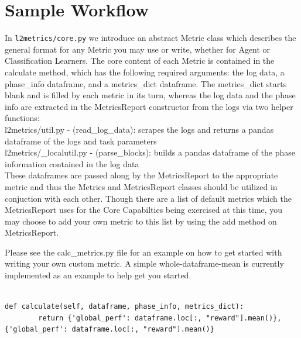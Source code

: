 \section{Sample Workflow}

In \verb|l2metrics/core.py| we introduce an abstract Metric class which describes the general format for any Metric you may use or write, whether for Agent or Classification Learners. The core content of each Metric is contained in the calculate method, which has the following required arguments: the log data, a phase\_info dataframe, and a metrics\_dict dataframe. The metrics\_dict starts blank and is filled by each metric in its turn, whereas the log data and the phase info are extracted in the MetricsReport constructor from the logs via two helper functions: \\[0.1in]

l2metrics/util.py - (read\_log\_data): scrapes the logs and returns a pandas dataframe of the logs and task parameters\\
l2metrics/\_localutil.py - (parse\_blocks): builds a pandas dataframe of the phase information contained in the log data\\[0.1in]

These dataframes are passed along by the MetricsReport to the appropriate metric and thus the Metrics and MetricsReport classes should be utilized in conjuction with each other. Though there are a list of default metrics which the MetricsReport uses for the Core Capabilties being exercised at this time, you may choose to add your own metric to this list by using the add method on MetricsReport. 

Please see the calc\_metrics.py file for an example on how to get started with writing your own custom metric. A simple whole-dataframe-mean is currently implemented as an example to help get you started.

\begin{verbatim}    

def calculate(self, dataframe, phase_info, metrics_dict):
        return {'global_perf': dataframe.loc[:, "reward"].mean()}, {'global_perf': dataframe.loc[:, "reward"].mean()}
\end{verbatim}

\fi

